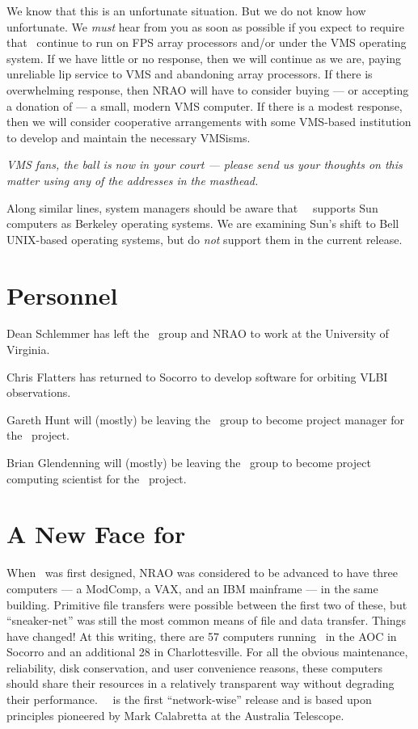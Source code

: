 We know that this is an unfortunate situation.  But we do not know how
unfortunate.  We {\it must\/} hear from you as soon as possible if you
expect to require that \AIPS\ continue to run on FPS array processors
and/or under the VMS operating system.  If we have little or no
response, then we will continue as we are, paying unreliable lip
service to VMS and abandoning array processors.  If there is
overwhelming response, then NRAO will have to consider buying --- or
accepting a donation of --- a small, modern VMS computer.  If there is
a modest response, then we will consider cooperative arrangements with
some VMS-based institution to develop and maintain the necessary
VMSisms.

{\Large\it VMS fans, the ball is now in your court --- please send us
your thoughts on this matter using any of the addresses in the
masthead.}

Along similar lines, system managers should be aware that
\RELEASENAME\ \AIPS\ supports Sun computers as Berkeley operating
systems.  We are examining Sun's shift to Bell UNIX-based operating
systems, but do {\it not} support them in the current release.

\section{Personnel}
Dean Schlemmer has left the \AIPS\ group and NRAO to work at the
University of Virginia.

Chris Flatters has returned to Socorro to develop software for
orbiting VLBI observations.

Gareth Hunt will (mostly) be leaving the \AIPS\ group to become
project manager for the \AIPTOO\ project.

Brian Glendenning will (mostly) be leaving the \AIPS\ group to become
project computing scientist for the \AIPTOO\ project.

\section{A New Face for \AIPS}

When \AIPS\ was first designed, NRAO was considered to be advanced to
have three computers --- a ModComp, a VAX, and an IBM mainframe ---
in the same building.  Primitive file transfers were possible between
the first two of these, but ``sneaker-net'' was still the most common
means of file and data transfer.  Things have changed!  At this
writing, there are 57 computers running \AIPS\ in the AOC in Socorro
and an additional 28 in  Charlottesville.  For all the obvious
maintenance, reliability, disk conservation, and user convenience
reasons, these computers should share their resources in a relatively
transparent way without degrading their performance.  \RELEASENAME\
\AIPS\ is the first ``network-wise'' release and is based upon
principles pioneered by Mark Calabretta at the Australia Telescope.

